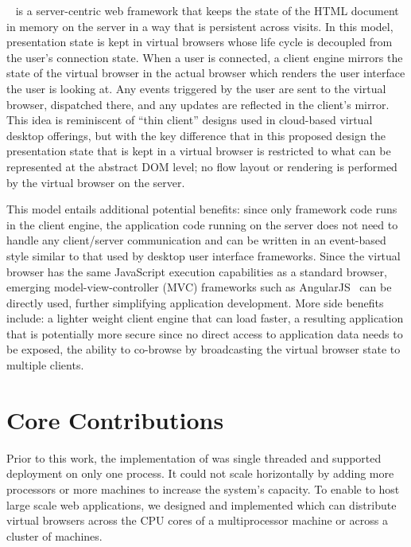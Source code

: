 \cb{}~\cite{mcdaniel2012cloudbrowser} is a server-centric web framework 
that keeps the state of the HTML document in memory 
on the server in a way that is persistent across visits.
In this model, presentation state is kept in virtual browsers whose life
cycle is decoupled from the user's connection state.  When a user is connected,
a client engine mirrors the state of the virtual browser in the actual browser which
renders the user interface the user is looking at.  Any events triggered by the
user are sent to the virtual browser, dispatched there, and any updates
are reflected in the client's mirror.  This idea is reminiscent of 
``thin client'' designs used in cloud-based virtual desktop offerings,
but with the key difference that in this proposed design the presentation state
that is kept in a virtual browser is restricted to what can be represented at the
abstract DOM level; no flow layout or rendering is performed by the virtual browser on the 
server.

This model entails additional potential benefits: since only framework code runs in
the client engine, the application code running on the server does not need
to handle any client/server communication and can be written in an event-based
style similar to that used by desktop user interface frameworks.
Since the virtual browser has the same JavaScript execution capabilities as a
standard browser, emerging model-view-controller (MVC) frameworks such as 
AngularJS~\cite{hevery2009angular} can be directly used, further simplifying application development.
More side benefits include: a lighter weight client engine that can load faster,
a resulting application that is potentially more secure since no direct access to
application data needs to be exposed, the ability to co-browse by broadcasting
the virtual browser state to multiple clients.


\section{Core Contributions}

Prior to this work, the implementation of \cb{} was single threaded and
supported deployment on only one process. It could not scale horizontally by
adding more processors or more machines to increase the system's capacity. To
enable \cb{} to host large scale web applications, we designed and implemented
\cbtwo which can distribute virtual browsers  across the CPU cores of a
multiprocessor machine or across a cluster of machines.

